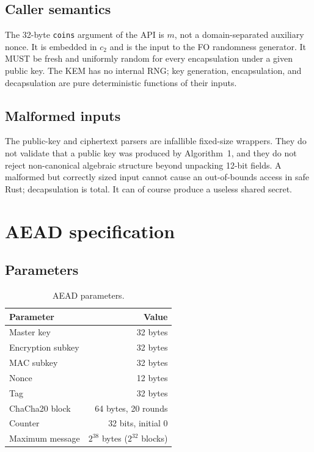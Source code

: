 \documentclass[11pt,a4paper]{article}
\theoremstyle{plain}
\theoremstyle{definition}
\theoremstyle{remark}
\begin{document}
\subsection{Caller semantics}

The 32-byte \texttt{coins} argument of the API is $m$, not a
domain-separated auxiliary nonce.  It is embedded in $c_2$ and is the
input to the FO randomness generator.  It MUST be fresh and uniformly
random for every encapsulation under a given public key.  The KEM has
no internal RNG; key generation, encapsulation, and decapsulation are
pure deterministic functions of their inputs.

\subsection{Malformed inputs}

The public-key and ciphertext parsers are infallible fixed-size
wrappers.  They do not validate that a public key was produced by
Algorithm~1, and they do not reject non-canonical algebraic structure
beyond unpacking 12-bit fields.  A malformed but correctly sized input
cannot cause an out-of-bounds access in safe Rust; decapsulation is
total.  It can of course produce a useless shared secret.

\section{AEAD specification}
\label{sec:aead}

\subsection{Parameters}

\begin{table}[t]
\centering
\small
\begin{tabular}{@{}lr@{}}
\toprule
Parameter & Value \\
\midrule
Master key & 32 bytes \\
Encryption subkey & 32 bytes \\
MAC subkey & 32 bytes \\
Nonce & 12 bytes \\
Tag & 32 bytes \\
ChaCha20 block & 64 bytes, 20 rounds \\
Counter & 32 bits, initial 0 \\
Maximum message & $2^{38}$ bytes ($2^{32}$ blocks) \\
\bottomrule
\end{tabular}
\caption{AEAD parameters.}
\label{tab:aeadparams}
\end{table}
\end{document}
